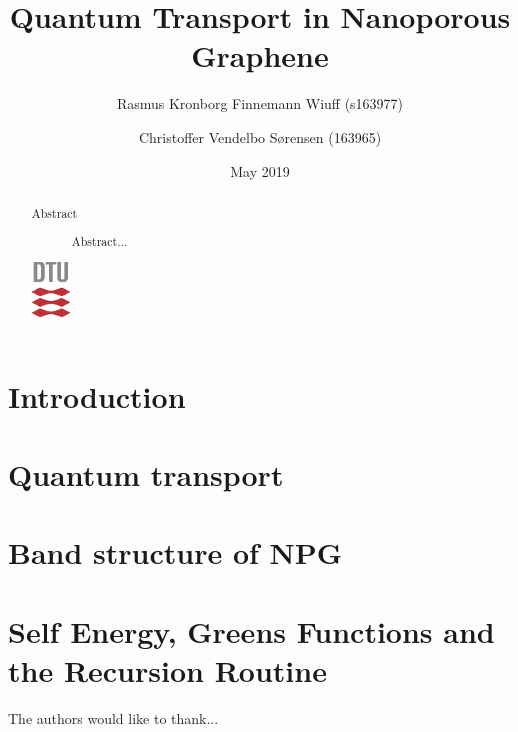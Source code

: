 \documentclass[aps, prb, a4paper, english, 12pt, onecolumn, longbibliography, amsmath, amssymb, colorinlistoftodos, floatfix, svgnames]{revtex4-2}
\numberwithin{equation}{subsection}
\begin{document}
\begin{abstract}
	\vspace{5mm}
	\centering
	\begin{description}
		\item[Abstract] Abstract... \vspace{3\baselineskip}
	\end{description}
	\includegraphics[width=1cm]{Figures/DTU3CMYK.eps}
\end{abstract}

\title{Quantum Transport in Nanoporous Graphene}
\date{May  2019}
\author{Rasmus Kronborg Finnemann Wiuff (s163977)}
\author{Christoffer Vendelbo Sørensen (163965)}
\maketitle

\twocolumngrid
\tableofcontents
\onecolumngrid

\makeatletter
\let\toc@pre\relax
\let\toc@post\relax
\makeatother

\thispagestyle{empty}
\setcounter{page}{1}

\section{Introduction}

\section{Quantum transport}

\section{Band structure of NPG}

\section{Self Energy, Greens Functions and the Recursion Routine}

\newpage
\begin{acknowledgments}
	The authors would like to thank...
\end{acknowledgments}
\onecolumngrid


\newpage
\listoffigures
\listoftables
\listoflistings
\newpage

\end{document}
